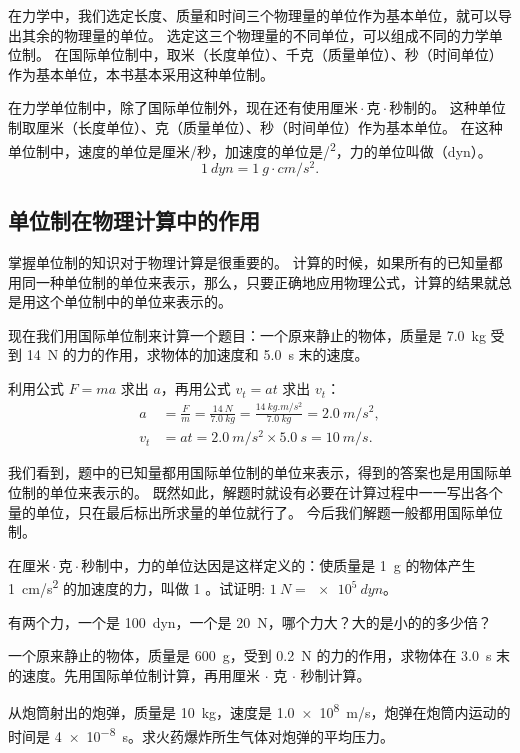 在力学中，我们选定长度、质量和时间三个物理量的单位作为基本单位，就可以导出其余的物理量的单位。
选定这三个物理量的不同单位，可以组成不同的力学单位制。
在国际单位制中，取米（长度单位）、千克（质量单位）、秒（时间单位）作为基本单位，本书基本采用这种单位制。

在力学单位制中，除了国际单位制外，现在还有使用厘米\,$\cdot$\,克\,$\cdot$\,秒制的。
这种单位制取厘米（长度单位）、克（质量单位）、秒（时间单位）作为基本单位。
在这种单位制中，速度的单位是厘米/秒，加速度的单位是\unit{/^2}，力的单位叫做（\unit{dyn}）。
\[\qty{1}{dyn}=\qty{1}{g \cdot cm/s^2}.\]

\subsection{单位制在物理计算中的作用}
掌握单位制的知识对于物理计算是很重要的。
计算的时候，如果所有的已知量都用同一种单位制的单位来表示，那么，只要正确地应用物理公式，计算的结果就总是用这个单位制中的单位来表示的。

现在我们用国际单位制来计算一个题目：一个原来静止的物体，质量是 \qty{7.0}{kg} 受到 \qty{14}{N} 的力的作用，求物体的加速度和 \qty{5.0}{s} 末的速度。

利用公式 $F= ma$ 求出 $a$，再用公式 $v_t= at$ 求出 $v_t$：
\[\begin{split}
a&=\frac{F}{m}=\frac{\qty{14}{N}}{\qty{7.0}{kg}}=\frac{\qty{14}{kg.m/s^2}}{\qty{7.0}{kg}}= \qty{2.0}{m/s^2},\\
v_t&=at= \qty{2.0}{m/s^2} \times \qty{5.0}{s}= \qty{10}{m/s}. 
\end{split} \]

我们看到，题中的已知量都用国际单位制的单位来表示，得到的答案也是用国际单位制的单位来表示的。
既然如此，解题时就设有必要在计算过程中一一写出各个量的单位，只在最后标出所求量的单位就行了。
今后我们解题一般都用国际单位制。

\begin{Practice}
\begin{question}
\item 在厘米\,$\cdot$\,克\,$\cdot$\,秒制中，力的单位达因是这样定义的：使质量是 \qty{1}{g} 的物体产生 \qty{1}{cm/s^2} 的加速度的力，叫做 1 。试证明: $\qty{1}{N}=\qty{e5}{dyn}$。
\item 有两个力，一个是 \qty{100}{dyn}，一个是 \qty{20}{N}，哪个力大？大的是小的的多少倍？
\item 一个原来静止的物体，质量是 \qty{600}{g}，受到 \qty{0.2}{N} 的力的作用，求物体在 \qty{3.0}{s} 末的速度。先用国际单位制计算，再用厘米 $\cdot$ 克 $\cdot$ 秒制计算。
\item 从炮筒射出的炮弹，质量是 \qty{10}{kg}，速度是 \qty{1.0e8}{m/s}，炮弹在炮筒内运动的时间是 \qty{4e-8}{s}。求火药爆炸所生气体对炮弹的平均压力。
\end{question}
\end{Practice}

